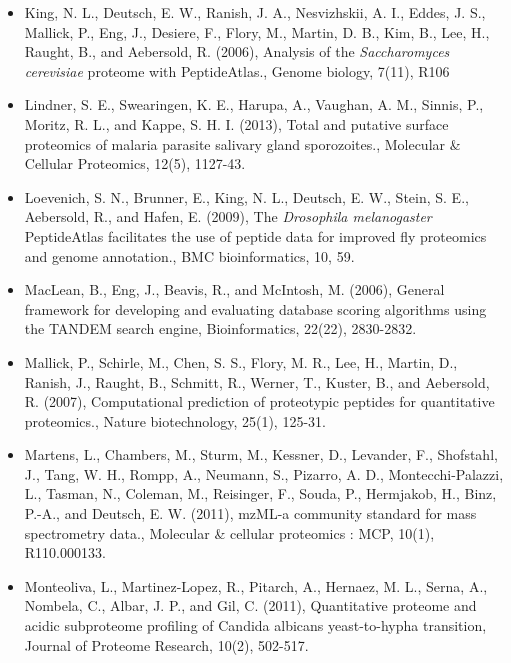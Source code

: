 \begin{itemize}[leftmargin=*]
\item[]{
King, N. L., Deutsch, E. W., Ranish, J. A., Nesvizhskii, A. I., Eddes, J. S., Mallick, P., Eng, J.,
Desiere, F., Flory, M., Martin, D. B., Kim, B., Lee, H., Raught, B., and Aebersold, R. (2006),
Analysis of the \textit{Saccharomyces cerevisiae} proteome with PeptideAtlas., Genome biology,
7(11), R106
}

\item[]{
Lindner, S. E., Swearingen, K. E., Harupa, A., Vaughan, A. M., Sinnis, P., Moritz, R. L., and
Kappe, S. H. I. (2013), Total and putative surface proteomics of malaria parasite salivary
gland sporozoites., Molecular \& Cellular Proteomics, 12(5), 1127-43.
}

\item[]{
Loevenich, S. N., Brunner, E., King, N. L., Deutsch, E. W., Stein, S. E., Aebersold, R., and
Hafen, E. (2009), The \textit{Drosophila melanogaster} PeptideAtlas facilitates the use of peptide
data for improved fly proteomics and genome annotation., BMC bioinformatics, 10, 59.
}

\item[]{
MacLean, B., Eng, J., Beavis, R., and McIntosh, M. (2006), General framework for developing
and evaluating database scoring algorithms using the TANDEM search engine, 
Bioinformatics, 22(22), 2830-2832.
}

\item[]{
Mallick, P., Schirle, M., Chen, S. S., Flory, M. R., Lee, H., Martin, D., Ranish, J., Raught, B.,
Schmitt, R., Werner, T., Kuster, B., and Aebersold, R. (2007), Computational prediction of
proteotypic peptides for quantitative proteomics., Nature biotechnology, 25(1), 125-31.
}

\item[]{
Martens, L., Chambers, M., Sturm, M., Kessner, D., Levander, F., Shofstahl, J., Tang, W. H.,
Rompp, A., Neumann, S., Pizarro, A. D., Montecchi-Palazzi, L., Tasman, N., Coleman, M.,
Reisinger, F., Souda, P., Hermjakob, H., Binz, P.-A., and Deutsch, E. W. (2011), mzML-a
community standard for mass spectrometry data., Molecular \& cellular proteomics : MCP,
10(1), R110.000133.
}

\item[]{
Monteoliva, L., Martinez-Lopez, R., Pitarch, A., Hernaez, M. L., Serna, A., Nombela, C., Albar,
J. P., and Gil, C. (2011), Quantitative proteome and acidic subproteome profiling of Candida
albicans yeast-to-hypha transition, Journal of Proteome Research, 10(2), 502-517.
}


\end{itemize}
